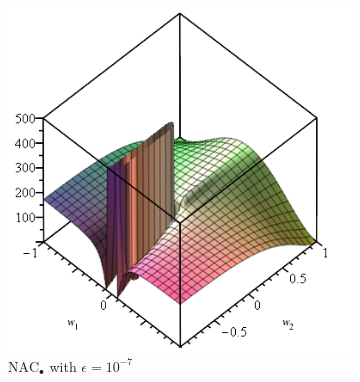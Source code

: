 

\begin{figure}[h]
\centering
\begin{subfigure}{.33\textwidth}
  \centering
  \includegraphics[width=\linewidth,trim={0 0 0 4.3cm},clip]{graphics/nac-mul-eps-1em7.png}
  \caption{$\mathrm{NAC}_{\bullet}$ with $\epsilon = 10^{-7}$}
\end{subfigure}%
\begin{subfigure}{.33\textwidth}
  \centering

\end{subfigure}
\end{figure}
